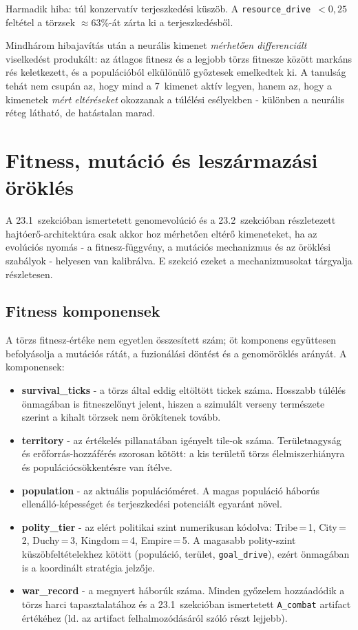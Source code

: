 ﻿\documentclass[a4paper,12pt]{report}
\begin{document}
Harmadik hiba: túl konzervatív terjeszkedési küszöb.
A \texttt{resource\_drive}~$< 0{,}25$ feltétel a törzsek $\approx63$\%-át zárta
ki a terjeszkedésből.

Mindhárom hibajavítás után a neurális kimenet \textit{mérhetően differenciált}
viselkedést produkált: az átlagos fitnesz és a legjobb törzs fitnesze között
markáns rés keletkezett, és a populációból elkülönülő győztesek emelkedtek ki.
A tanulság tehát nem csupán az, hogy mind a 7~kimenet aktív legyen,
hanem az, hogy a kimenetek \textit{mért eltéréseket} okozzanak a túlélési
esélyekben - különben a neurális réteg látható, de hatástalan marad.

\section{Fitness, mutáció és leszármazási öröklés}
\label{sec:neurosim-25-fitness}

A 23.1~szekcióban ismertetett genomevolúció és a 23.2~szekcióban részletezett
hajtóerő-architektúra csak akkor hoz mérhetően eltérő kimeneteket, ha az evolúciós
nyomás - a fitnesz-függvény, a mutációs mechanizmus és az öröklési szabályok -
helyesen van kalibrálva. E szekció ezeket a mechanizmusokat tárgyalja részletesen.

\subsection*{Fitness komponensek}

A törzs fitnesz-értéke nem egyetlen összesített szám; öt komponens együttesen
befolyásolja a mutációs rátát, a fuzionálási döntést és a genomöröklés arányát.
A komponensek:

\begin{itemize}
  \item \textbf{survival\_ticks} - a törzs által eddig eltöltött tickek száma.
    Hosszabb túlélés önmagában is fitneszelőnyt jelent, hiszen a szimulált verseny
    természete szerint a kihalt törzsek nem örökítenek tovább.
  \item \textbf{territory} - az értékelés pillanatában igényelt tile-ok száma.
    Területnagyság és erőforrás-hozzáférés szorosan kötött: a kis területű törzs
    élelmiszerhiányra és populációcsökkentésre van ítélve.
  \item \textbf{population} - az aktuális populációméret. A magas populáció
    háborús ellenálló-képességet és terjeszkedési potenciált egyaránt növel.
  \item \textbf{polity\_tier} - az elért politikai szint numerikusan kódolva:
    Tribe\,=\,1, City\,=\,2, Duchy\,=\,3, Kingdom\,=\,4, Empire\,=\,5.
    A magasabb polity-szint küszöbfeltételekhez kötött (populáció, terület,
    \texttt{goal\_drive}), ezért önmagában is a koordinált stratégia jelzője.
  \item \textbf{war\_record} - a megnyert háborúk száma. Minden győzelem
    hozzáadódik a törzs harci tapasztalatához és a 23.1~szekcióban ismertetett
    \texttt{A\_combat} artifact értékéhez (ld. az artifact felhalmozódásáról szóló
    részt lejjebb).
\end{itemize}
\end{document}
